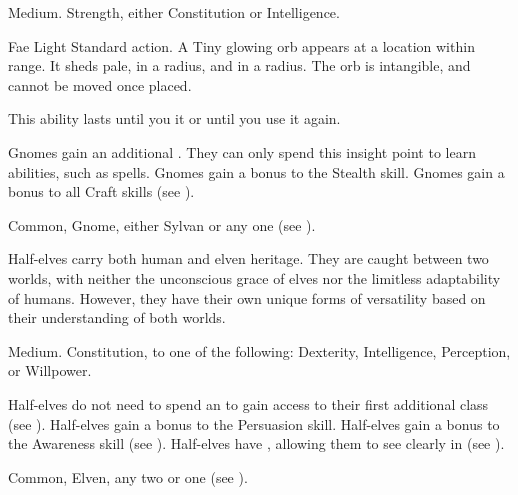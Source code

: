   Medium.
    Strength, either  Constitution or  Intelligence.
  \begin{raggeditemize}
    \begin{activeability}{Fae Light}
      \abilityusagetime Standard action.
      \rankline
      A Tiny glowing orb appears at a location within \rngmed range.
      It sheds pale,  in a \areasmall radius, and  in a \areamed radius.
      The orb is intangible, and cannot be moved once placed.

      This ability lasts until you  it or until you use it again.
    \end{activeability}
     Gnomes gain an additional .
      They can only spend this insight point to learn \magical abilities, such as spells.
     Gnomes gain a  bonus to the Stealth skill.
     Gnomes gain a  bonus to all Craft skills (see ).
  \end{raggeditemize}
   Common, Gnome, either Sylvan or any one  (see ).


  Half-elves carry both human and elven heritage.
  They are caught between two worlds, with neither the unconscious grace of elves nor the limitless adaptability of humans.
  However, they have their own unique forms of versatility based on their understanding of both worlds.

   Medium.
    Constitution,  to one of the following: Dexterity, Intelligence, Perception, or Willpower.
  \begin{raggeditemize}
     Half-elves do not need to spend an  to gain access to their first additional class (see ).
     Half-elves gain a  bonus to the Persuasion skill.
     Half-elves gain a  bonus to the Awareness skill (see ).
     Half-elves have , allowing them to see clearly in  (see ).
  \end{raggeditemize}
   Common, Elven, any two  or one  (see ).

